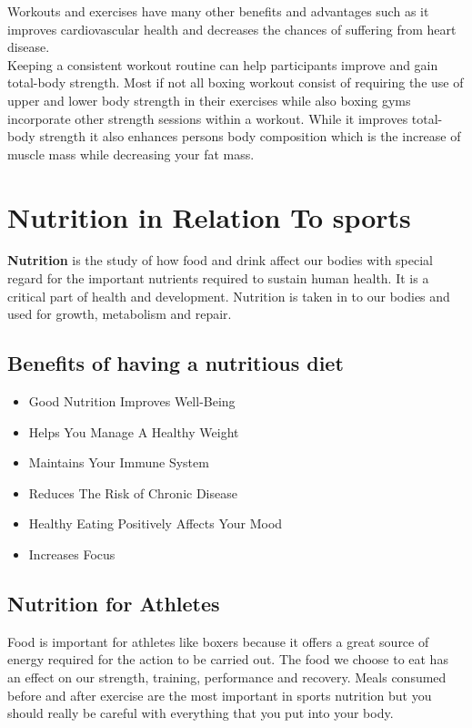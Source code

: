 \documentclass[a4paper,12pt]{report}
\begin{document}
Workouts and exercises have many other benefits and advantages such as it improves cardiovascular health and decreases the chances of suffering from heart disease.\\

Keeping a consistent workout routine can help participants improve and gain total-body strength. Most if not all boxing workout consist of requiring the use of upper and lower body strength in their exercises while also boxing gyms incorporate other strength sessions within a workout. While it improves total-body strength it also enhances persons body composition which is the increase of muscle mass while decreasing your fat mass.\cite{workoutBenifits}   
\newpage
\section{Nutrition in Relation To sports}
 \textbf{Nutrition} is the study of how food and drink affect our bodies with special regard for the important nutrients required to sustain human health. It is a critical part of health and development. Nutrition is taken in to our bodies and used for growth, metabolism and repair.
 
\subsection{Benefits of having a nutritious diet}
\begin{itemize}
    \item Good Nutrition Improves Well-Being 
    \item Helps You Manage A Healthy Weight
    \item Maintains Your Immune System
    \item Reduces The Risk of Chronic Disease
    \item Healthy Eating Positively Affects Your Mood
    \item Increases Focus
\end{itemize}

\subsection{Nutrition for Athletes}
Food is important for athletes like boxers because it offers a great source of energy required for the action to be carried out. The food we choose to eat has an effect on our strength, training, performance and recovery.
Meals consumed before and after exercise are the most important in sports nutrition but you should really be careful with everything that you put into your body.
\cite{Nutrition}
\end{document}
